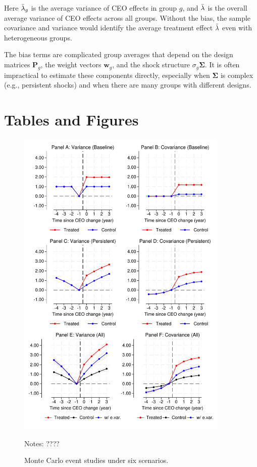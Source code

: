 \documentclass[11pt,a4paper]{article}
\begin{document}
Here $\Bar\lambda_g$ is the average variance of CEO effects in group $g$, and $\Bar\lambda$ is the overall average variance of CEO effects across all groups. Without the bias, the sample covariance and variance would identify the average treatment effect $\Bar\lambda$ even with heterogeneous groups.

The bias terms are complicated group averages that depend on the design matrices $\mathbf P_g$, the weight vectors $\mathbf w_g$, and the shock structure $\sigma_g\mathbf\Sigma$. It is often impractical to estimate these components directly, especially when $\mathbf\Sigma$ is complex (e.g., persistent shocks) and when there are many groups with different designs.

\clearpage


\clearpage

\section*{Tables and Figures}


\begin{figure}[htbp]
\centering
\includegraphics[width=0.9\textwidth]{figure/figuremc.pdf}
\caption{Monte Carlo event studies under six scenarios.} \label{fig:mc}
\vspace{.2cm}

\begin{minipage}{0.9\textwidth}
\footnotesize Notes: ????
\end{minipage}
\end{figure}
\end{document}
